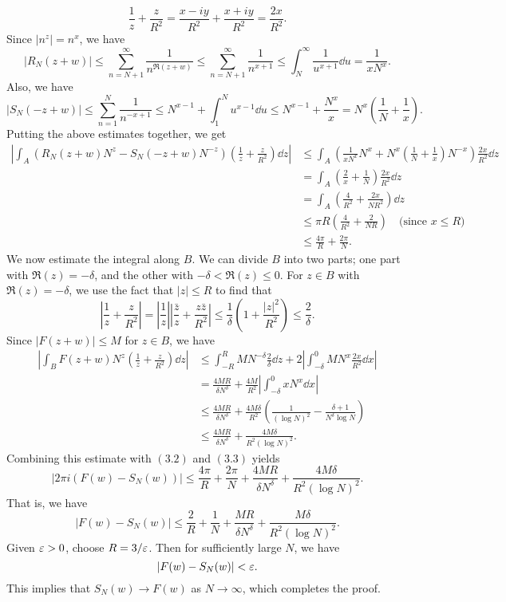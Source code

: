 \begin{pf}
\[ \frac1z + \frac z{R^2} = \frac{x-iy}{R^2} + \frac{x + iy}{R^2} = \frac{2x}{R^2}. \]
Since $|n^z| = n^x$, we have 
\[ |R_N(z+w)| \leq \sum_{n=N+1}^\infty \frac{1}{n^{\Re(z+w)}} \leq \sum_{n=N+1}^\infty 
\frac{1}{n^{x+1}} \leq \int_N^\infty \frac{1}{u^{x+1}}\dd u = \frac{1}{xN^x}. \]
Also, we have 
\[ |S_N(-z+w)| \leq \sum_{n=1}^N \frac{1}{n^{-x+1}} \leq N^{x-1} + \int_1^N u^{x-1}\dd u 
\leq N^{x-1} + \frac{N^x}{x} = N^x \left( \frac1N + \frac1x \right). \]
Putting the above estimates together, we get 
\begin{align*}
    \left| \int_A \left( R_N(z+w) N^z - S_N(-z+w) N^{-z} \right) \left( \frac1z + \frac z{R^2} \right) \dd z \right| 
    &\leq \int_A \left( \frac{1}{xN^x} N^x + N^x \left( \frac1N + \frac1x \right) N^{-x} \right) 
    \frac{2x}{R^2}\dd z \\
    &= \int_A \left( \frac2x + \frac1N \right) \frac{2x}{R^2}\dd z \\
    &= \int_A \left( \frac4{R^2} + \frac{2x}{NR^2} \right)\dd z \\
    &\leq \pi R \left( \frac4{R^2} + \frac{2}{NR} \right) \quad \text{(since $x \leq R$)} \\
    &\leq \frac{4\pi}R + \frac{2\pi}N. 
\end{align*}
We now estimate the integral along $B$. We can divide $B$ into two parts; one part with $\Re(z) = 
-\delta$, and the other with $-\delta < \Re(z) \leq 0$. For $z \in B$ with $\Re(z) = -\delta$, 
we use the fact that $|z| \leq R$ to find that 
\[ \left| \frac1z + \frac z{R^2} \right| = \left| \frac1z \right| \left| \frac{\bar z}{z} + 
\frac{z\bar z}{R^2} \right| \leq \frac1\delta \left( 1 + \frac{|z|^2}{R^2} \right) \leq \frac2\delta. \]
Since $|F(z+w)| \leq M$ for $z \in B$, we have 
\begin{align*}
    \left| \int_B F(z+w) N^z \left( \frac1z + \frac z{R^2} \right)\dd z \right| 
    &\leq \int_{-R}^R MN^{-\delta} \frac2\delta\dd z + 2 \left| \int_{-\delta}^0 MN^x \frac{2x}{R^2}\dd x \right| \\
    &= \frac{4MR}{\delta N^\delta} + \frac{4M}{R^2} \left| \int_{-\delta}^0 xN^x \dd x \right| \\
    &\leq \frac{4MR}{\delta N^\delta} + \frac{4M\delta}{R^2} \left( \frac1{(\log N)^2} - \frac{\delta+1}{N^\delta \log N} \right) \\
    &\leq \frac{4MR}{\delta N^\delta} + \frac{4M\delta}{R^2(\log N)^2}. 
\end{align*}
Combining this estimate with $(3.2)$ and $(3.3)$ yields 
\[ |2\pi i(F(w) - S_N(w))| \leq \frac{4\pi}R + \frac{2\pi}N + \frac{4MR}{\delta N^\delta} 
+ \frac{4M\delta}{R^2(\log N)^2}. \] 
That is, we have 
\[ |F(w) - S_N(w)| \leq \frac2R + \frac1N + \frac{MR}{\delta N^\delta} + \frac{M\delta}{R^2(\log N)^2}. \]
Given $\varepsilon > 0$, choose $R = 3/\varepsilon$. Then for sufficiently large $N$, we have 
\[ |F(w) - S_N(w)| < \varepsilon. \]
This implies that $S_N(w) \to F(w)$ as $N \to \infty$, which completes the proof. 
\end{pf}

